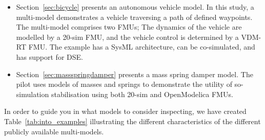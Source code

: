 \begin{itemize}
  \item Section~\ref{sec:bicycle} presents an autonomous vehicle model. In this study, a multi-model demonstrates a vehicle traversing a path of defined waypoints. The multi-model comprises two FMUs; The dynamics of the vehicle are modelled by a 20-sim FMU, and the vehicle control is determined by a VDM-RT FMU. The example has a SysML architecture, can be co-simulated, and has support for DSE.
  \item Section~\ref{sec:massspringdamper} presents a mass spring damper model. The pilot uses models of masses and springs to demonstrate the utility of so-simulation stabilisation using both 20-sim and OpenModelica FMUs.
 
  
\end{itemize}

In order to guide you in what models to consider inspecting, we have created Table~\ref{tab:into_examples} illustrating the different characteristics of the different publicly available multi-models. 

